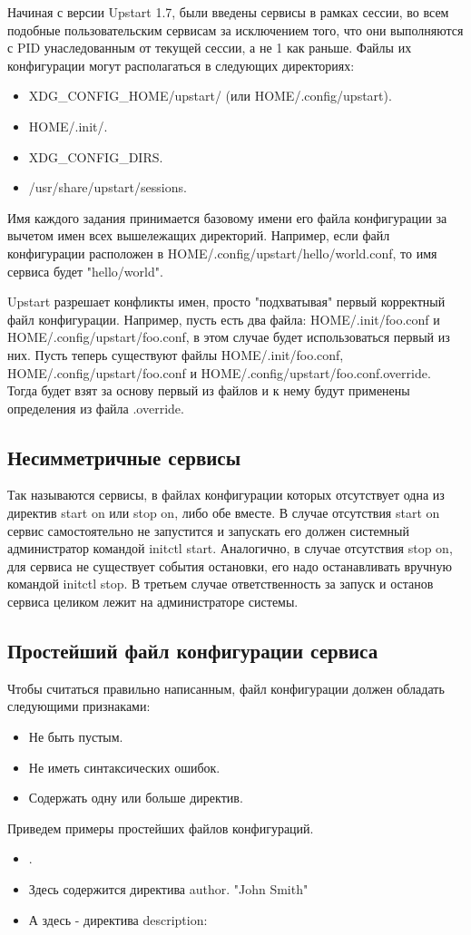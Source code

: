 Начиная с версии Upstart 1.7, были введены сервисы в рамках сессии, во всем подобные пользовательским сервисам за исключением того, что они выполняются с PID унаследованным от текущей сессии, а не 1 как
раньше. 
Файлы их конфигурации могут располагаться в следующих директориях: \begin{itemize}
\item \textdollar XDG\_CONFIG\_HOME/upstart/ (или \textdollar HOME/.config/upstart).
\item \textdollar HOME/.init/.
\item \textdollar XDG\_CONFIG\_DIRS.
\item /usr/share/upstart/sessions.
\end{itemize}
Имя каждого задания принимается базовому имени его файла конфигурации за вычетом имен всех вышележащих директорий. Например, если файл конфигурации расположен в \textdollar HOME/.config/upstart/hello/world.conf, то имя сервиса будет "hello/world".

Upstart разрешает конфликты имен, просто "подхватывая" первый корректный файл конфигурации. Например, пусть есть два файла: \textdollar HOME/.init/foo.conf и \textdollar HOME/.config/upstart/foo.conf, 
в этом случае будет использоваться первый из них. Пусть теперь существуют файлы \textdollar HOME/.init/foo.conf, \textdollar HOME/.config/upstart/foo.conf и \textdollar HOME/.config/upstart/foo.conf.override. Тогда будет взят за основу первый из файлов и к нему будут применены определения из файла .override.
\subsection{Несимметричные сервисы}
Так называются сервисы, в файлах конфигурации которых отсутствует одна из директив start on или stop on, либо обе вместе. В случае отсутствия start on сервис самостоятельно не запустится и запускать его должен системный администратор командой initctl start. Аналогично, в случае отсутствия stop on, для сервиса не существует события остановки, его надо останавливать вручную командой initctl stop. В третьем случае ответственность за запуск и останов сервиса целиком лежит на администраторе системы.
\subsection{Простейший файл конфигурации сервиса}
Чтобы считаться правильно написанным, файл конфигурации должен обладать следующими признаками: \begin{itemize}
\item Не быть пустым.
\item Не иметь синтаксических ошибок.
\item Содержать одну или больше директив.
\end{itemize}
Приведем примеры простейших файлов конфигураций. 
\begin{itemize}
\item {}.
\item Здесь содержится директива author.  {"John Smith"}  
\item А здесь - директива description:  
\end{itemize}
